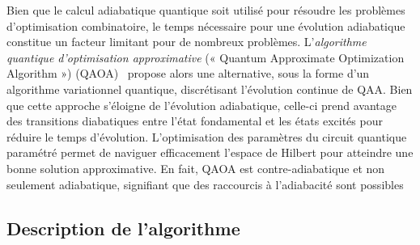 Bien que le calcul adiabatique quantique soit utilisé pour résoudre les problèmes d'optimisation combinatoire, le temps nécessaire pour une évolution adiabatique constitue un facteur limitant pour de nombreux problèmes. L'\textit{algorithme quantique d'optimisation approximative} (« Quantum Approximate Optimization Algorithm ») (QAOA)~\cite{farhiQuantumApproximateOptimization2014} propose alors une alternative, sous la forme d'un algorithme variationnel quantique, discrétisant l'évolution continue de QAA. Bien que cette approche s'éloigne de l'évolution adiabatique, celle-ci prend avantage des transitions diabatiques entre l'état fondamental et les états excités pour réduire le temps d'évolution. L'optimisation des paramètres du circuit quantique paramétré permet de naviguer efficacement l'espace de Hilbert pour atteindre une bonne solution approximative. En fait, QAOA est contre-adiabatique et non seulement adiabatique, signifiant que des raccourcis à l'adiabacité sont possibles~\cite{wurtzCounterdiabaticityQuantumApproximate2022}





\subsection{Description de l'algorithme}
\label{subsec:description-algorithme}

